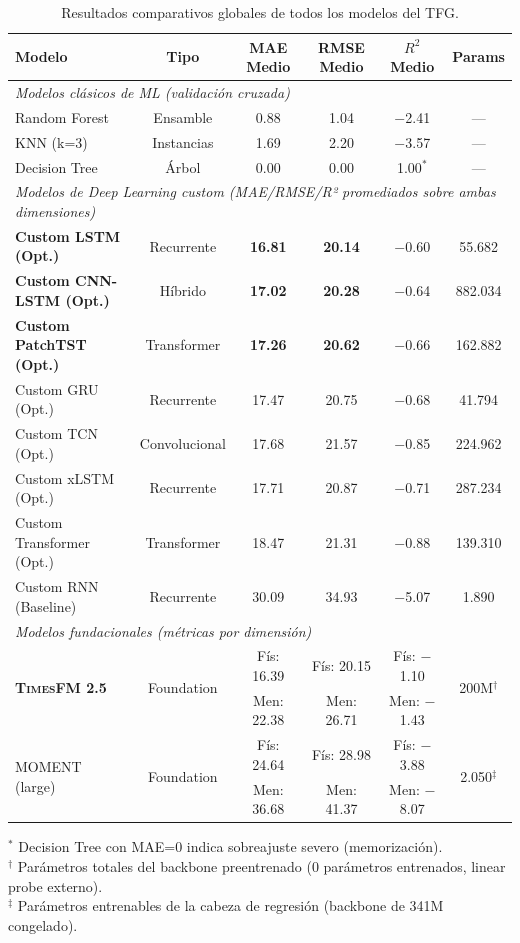 \documentclass[12pt, a4paper]{article}
\newcommand{\moment}{\textsc{MOMENT}}
\newcommand{\timesfm}{\textsc{TimesFM}}
\begin{document}
\begin{table}[H]
\centering
\caption{Resultados comparativos globales de todos los modelos del TFG.}
\label{tab:resultados_globales}
\small
\begin{tabular}{@{}lccccc@{}}
\toprule
\textbf{Modelo} & \textbf{Tipo} & \textbf{MAE Medio} & \textbf{RMSE Medio} & \textbf{$R^2$ Medio} & \textbf{Params} \\
\midrule
\multicolumn{6}{l}{\textit{Modelos clásicos de ML (validación cruzada)}} \\
Random Forest & Ensamble & 0.88 & 1.04 & $-$2.41 & --- \\
KNN (k=3) & Instancias & 1.69 & 2.20 & $-$3.57 & --- \\
Decision Tree & Árbol & 0.00 & 0.00 & 1.00$^*$ & --- \\
\midrule
\multicolumn{6}{l}{\textit{Modelos de Deep Learning custom (MAE/RMSE/R² promediados sobre ambas dimensiones)}} \\
\textbf{Custom LSTM (Opt.)} & Recurrente & \textbf{16.81} & \textbf{20.14} & $-$0.60 & 55.682 \\
\textbf{Custom CNN-LSTM (Opt.)} & Híbrido & \textbf{17.02} & \textbf{20.28} & $-$0.64 & 882.034 \\
\textbf{Custom PatchTST (Opt.)} & Transformer & \textbf{17.26} & \textbf{20.62} & $-$0.66 & 162.882 \\
Custom GRU (Opt.) & Recurrente & 17.47 & 20.75 & $-$0.68 & 41.794 \\
Custom TCN (Opt.) & Convolucional & 17.68 & 21.57 & $-$0.85 & 224.962 \\
Custom xLSTM (Opt.) & Recurrente & 17.71 & 20.87 & $-$0.71 & 287.234 \\
Custom Transformer (Opt.) & Transformer & 18.47 & 21.31 & $-$0.88 & 139.310 \\
Custom RNN (Baseline) & Recurrente & 30.09 & 34.93 & $-$5.07 & 1.890 \\
\midrule
\multicolumn{6}{l}{\textit{Modelos fundacionales (métricas por dimensión)}} \\
\multirow{2}{*}{\textbf{\timesfm{} 2.5}} & \multirow{2}{*}{Foundation} & Fís: 16.39 & Fís: 20.15 & Fís: $-$1.10 & \multirow{2}{*}{200M$^\dagger$} \\
& & Men: 22.38 & Men: 26.71 & Men: $-$1.43 & \\
\multirow{2}{*}{\moment{} (large)} & \multirow{2}{*}{Foundation} & Fís: 24.64 & Fís: 28.98 & Fís: $-$3.88 & \multirow{2}{*}{2.050$^\ddagger$} \\
& & Men: 36.68 & Men: 41.37 & Men: $-$8.07 & \\
\bottomrule
\end{tabular}
\begin{flushleft}
\footnotesize
$^*$ Decision Tree con MAE=0 indica sobreajuste severo (memorización). \\
$^\dagger$ Parámetros totales del backbone preentrenado (0 parámetros entrenados, linear probe externo). \\
$^\ddagger$ Parámetros entrenables de la cabeza de regresión (backbone de 341M congelado).
\end{flushleft}
\end{table}
\end{document}
